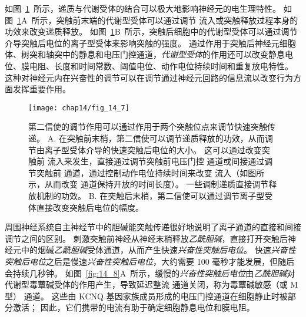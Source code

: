 如图~\ref{fig:14_7}~所示，递质与代谢受体的结合可以极大地影响神经元的电生理特性。
如图~\ref{fig:14_7}A~所示，突触前末端的代谢型受体可以通过调节  流入或突触释放过程本身的功效来改变递质释放。
如图~\ref{fig:14_7}B~所示，突触后细胞中的代谢型受体可以通过调节介导突触后电位的离子型受体来影响突触的强度。
通过作用于突触后神经元细胞体、树突和轴突中的静息和电压门控通道，\textit{代谢型受体}的作用还可以改变静息电位、膜电阻、长度和时间常数、阈值电位、动作电位持续时间和重复放电特性。
这种对神经元内在兴奋性的调节可以在调节通过神经元回路的信息流以改变行为方面发挥重要作用。


\begin{figure}[htbp]
	\centering
	\texttt{[image: chap14/fig\_14\_7]}
	\caption{第二信使的调节作用可以通过作用于两个突触位点来调节快速突触传递。
		A. 在突触前末梢，第二信使可以调节递质释放的功效，从而调节由离子型受体介导的快速突触后电位的大小。
		这可以通过改变突触前  流入来发生，直接通过调节突触前电压门控  通道或间接通过调节突触前  通道，通过控制动作电位持续时间来改变  流入（如图所示，从而改变  通道保持开放的时间长度）。
		一些调制递质直接调节释放机制的功效。
		B. 在突触后末梢，第二信使可以通过调节离子型受体直接改变突触后电位的幅度。}
	\label{fig:14_7}
\end{figure}


周围神经系统自主神经节中的胆碱能突触传递很好地说明了离子通道的直接和间接调节之间的区别。
刺激突触前神经从神经末梢释放\textit{乙酰胆碱}，直接打开突触后神经元中的烟碱\textit{乙酰胆碱}受体通道，从而产生快速\textit{兴奋性突触后电位}。
快速\textit{兴奋性突触后电位}之后是慢速\textit{兴奋性突触后电位}，大约需要 100 毫秒才能发展，但随后会持续几秒钟。
如图~\ref{fig:14_8}A~所示，缓慢的\textit{兴奋性突触后电位}由\textit{乙酰胆碱}对代谢型毒蕈碱受体的作用产生，导致延迟整流  通道关闭，称为毒蕈碱敏感（或 M 型） 通道。
这些由 KCNQ 基因家族成员形成的电压门控通道在细胞静止时被部分激活；
因此，它们携带的电流有助于确定细胞静息电位和膜电阻。


